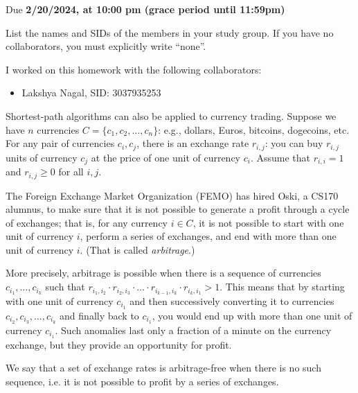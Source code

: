 \documentclass[10.5pt]{article}
\def\duedate{2/20/2024, at 10:00 pm (grace period until 11:59pm)}
\begin{document}
\maketitle


Due \textbf{\duedate}

List the names and SIDs of the members in your study group.
If you have no collaborators, you must explicitly write ``none''.

\begin{solution} I worked on this homework with the following collaborators:
\begin{itemize}
    \item Lakshya Nagal, SID: 3037935253
\end{itemize}
\end{solution}


Shortest-path algorithms can also be applied to currency trading.
Suppose we have $n$ currencies $C = \{c_1,c_2,\dots,c_n\}$:
e.g., dollars, Euros, bitcoins, dogecoins, etc.
For any pair of currencies  $c_i, c_j$, there is an exchange rate
$r_{i,j}$: you can buy $r_{i,j}$ units of currency $c_j$ at the price
of one unit of currency $c_i$.
Assume that $r_{i,i}=1$ and $r_{i,j}\ge 0$ for all $i,j$.

The Foreign Exchange Market Organization (FEMO) has hired Oski, a CS170
  alumnus, to make sure that it is not possible to generate a profit through a
  cycle of exchanges; that is, for any currency $i \in C$, it is not possible to
  start with one unit of currency $i$, perform a series of exchanges, and end
  with more than one unit of currency $i$. (That is called \textit{arbitrage}.)
  
More precisely, arbitrage is possible when there is a sequence of
  currencies $c_{i_1},\dots,c_{i_k}$ such that
  $r_{i_1,i_2} \cdot r_{i_2,i_3} \cdot \dots \cdot r_{i_{k-1},i_k} \cdot
  r_{i_k,i_1} > 1$.
  This means that by starting with one unit of currency $c_{i_1}$ and then
  successively converting it to currencies $c_{i_2},c_{i_3},\dots,c_{i_k}$ and
  finally back to $c_{i_1}$, you would end up with more than one unit of
  currency $c_{i_1}$.  Such anomalies last only a fraction of a minute on the
  currency exchange, but they provide an opportunity for profit.

We say that a set of exchange rates is arbitrage-free when there is no such sequence,
i.e. it is not possible to profit by a series of exchanges.
\end{document}
